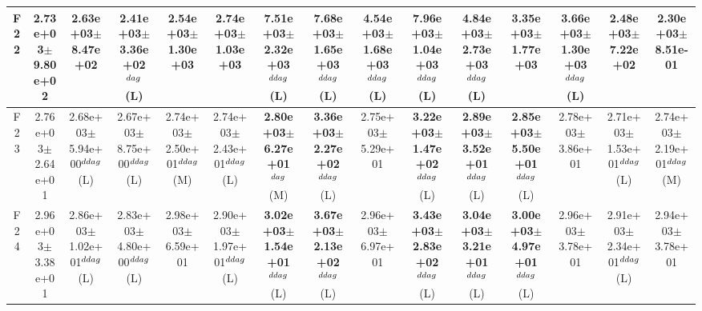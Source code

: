 \begin{table}[!t]
\begin{tabular}{c|cccccccccccccc}
F22  & 2.73e+03$\pm$9.80e+02  & 2.63e+03$\pm$8.47e+02   & 2.41e+03$\pm$3.36e+02$^{\\dag}$ (L)  & 2.54e+03$\pm$1.30e+03   & 2.74e+03$\pm$1.03e+03   & \textbf{7.51e+03$\pm$2.32e+03}$^{\\ddag}$ (L)  & \textbf{7.68e+03$\pm$1.65e+03}$^{\\ddag}$ (L)  & \textbf{4.54e+03$\pm$1.68e+03}$^{\\ddag}$ (L)  & \textbf{7.96e+03$\pm$1.04e+03}$^{\\ddag}$ (L)  & \textbf{4.84e+03$\pm$2.73e+03}$^{\\ddag}$ (L)  & 3.35e+03$\pm$1.77e+03   & \textbf{3.66e+03$\pm$1.30e+03}$^{\\ddag}$ (L)  & 2.48e+03$\pm$7.22e+02   & 2.30e+03$\pm$8.51e-01  \\ \hline
F23  & 2.76e+03$\pm$2.64e+01  & 2.68e+03$\pm$5.94e+00$^{\\ddag}$ (L)  & 2.67e+03$\pm$8.75e+00$^{\\ddag}$ (L)  & 2.74e+03$\pm$2.50e+01$^{\\ddag}$ (M)  & 2.74e+03$\pm$2.43e+01$^{\\ddag}$ (L)  & \textbf{2.80e+03$\pm$6.27e+01}$^{\\dag}$ (M)  & \textbf{3.36e+03$\pm$2.27e+02}$^{\\ddag}$ (L)  & 2.75e+03$\pm$5.29e+01   & \textbf{3.22e+03$\pm$1.47e+02}$^{\\ddag}$ (L)  & \textbf{2.89e+03$\pm$3.52e+01}$^{\\ddag}$ (L)  & \textbf{2.85e+03$\pm$5.50e+01}$^{\\ddag}$ (L)  & 2.78e+03$\pm$3.86e+01   & 2.71e+03$\pm$1.53e+01$^{\\ddag}$ (L)  & 2.74e+03$\pm$2.19e+01$^{\\ddag}$ (M) \\ \hline
F24  & 2.96e+03$\pm$3.38e+01  & 2.86e+03$\pm$1.02e+01$^{\\ddag}$ (L)  & 2.83e+03$\pm$4.80e+00$^{\\ddag}$ (L)  & 2.98e+03$\pm$6.59e+01   & 2.90e+03$\pm$1.97e+01$^{\\ddag}$ (L)  & \textbf{3.02e+03$\pm$1.54e+01}$^{\\ddag}$ (L)  & \textbf{3.67e+03$\pm$2.13e+02}$^{\\ddag}$ (L)  & 2.96e+03$\pm$6.97e+01   & \textbf{3.43e+03$\pm$2.83e+02}$^{\\ddag}$ (L)  & \textbf{3.04e+03$\pm$3.21e+01}$^{\\ddag}$ (L)  & \textbf{3.00e+03$\pm$4.97e+01}$^{\\ddag}$ (L)  & 2.96e+03$\pm$3.78e+01   & 2.91e+03$\pm$2.34e+01$^{\\ddag}$ (L)  & 2.94e+03$\pm$3.78e+01  \\ \hline

\end{tabular}
\end{table}
